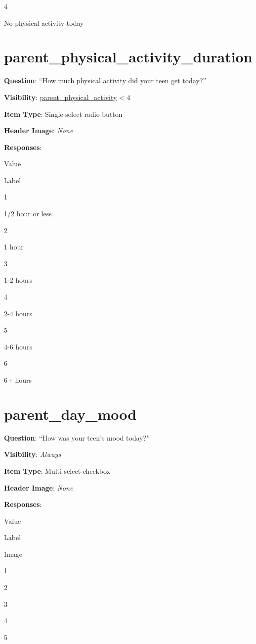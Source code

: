 \documentclass[]{book}
\begin{document}
4

No physical activity today

\hypertarget{parent_physical_activity_duration}{%
\section{parent\_physical\_activity\_duration}\label{parent_physical_activity_duration}}

\textbf{Question}: ``How much physical activity did your teen get today?''

\textbf{Visibility}: \protect\hyperlink{parent_physical_activity}{parent\_physical\_activity} \textless{} 4

\textbf{Item Type}: Single-select radio button

\textbf{Header Image}: \emph{None}

\textbf{Responses}:

Value

Label

1

1/2 hour or less

2

1 hour

3

1-2 hours

4

2-4 hours

5

4-6 hours

6

6+ hours

\hypertarget{parent_day_mood}{%
\section{parent\_day\_mood}\label{parent_day_mood}}

\textbf{Question}: ``How was your teen's mood today?''

\textbf{Visibility}: \emph{Always}

\textbf{Item Type}: Multi-select checkbox

\textbf{Header Image}: \emph{None}

\textbf{Responses}:

Value

Label

Image

1

2

3

4

5
\end{document}

